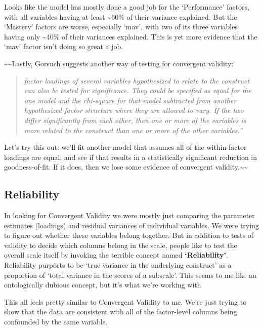 \documentclass[
  letterpaper,
  DIV=11,
  numbers=noendperiod]{scrreprt}
\begin{document}
Looks like the model has mostly done a good job for the `Performance'
factors, with all variables having at least \textasciitilde60\% of their
variance explained. But the `Mastery' factors are worse, especially
`mav', with two of its three variables having only \textasciitilde40\%
of their variances explained. This is yet more evidence that the `mav'
factor isn't doing so great a job.

\textasciitilde\textasciitilde Lastly, Gorsuch suggests another way of
testing for convergent validity:

\begin{quote}
\emph{factor loadings of several variables hypothesized to relate to the
construct can also be tested for significance. They could be specified
as equal for the one model and the chi-square for that model subtracted
from another hypothesized factor structure where they are allowed to
vary. If the two differ significantly from each other, then one or more
of the variables is more related to the construct than one or more of
the other variables.''}
\end{quote}

Let's try this out: we'll fit another model that assumes all of the
within-factor loadings are equal, and see if that results in a
statistically significant reduction in goodness-of-fit. If it does, then
we lose some evidence of convergent
validity.\textasciitilde\textasciitilde{}

\hypertarget{reliability}{%
\subsection*{Reliability}\label{reliability}}

In looking for Convergent Validity we were mostly just comparing the
parameter estimates (loadings) and residual variances of individual
variables. We were trying to figure out whether these variables belong
together. But in addition to tests of validity to decide which columns
belong in the scale, people like to test the overall scale itself by
invoking the terrible concept named \textbf{`Reliability'}. Reliability
purports to be `true variance in the underlying construct' as a
proportion of `total variance in the scores of a subscale'. This seems
to me like an ontologically dubious concept, but it's what we're working
with.

This all feels pretty similar to Convergent Validity to me. We're just
trying to show that the data are consistent with all of the factor-level
columns being confounded by the same variable.
\end{document}
